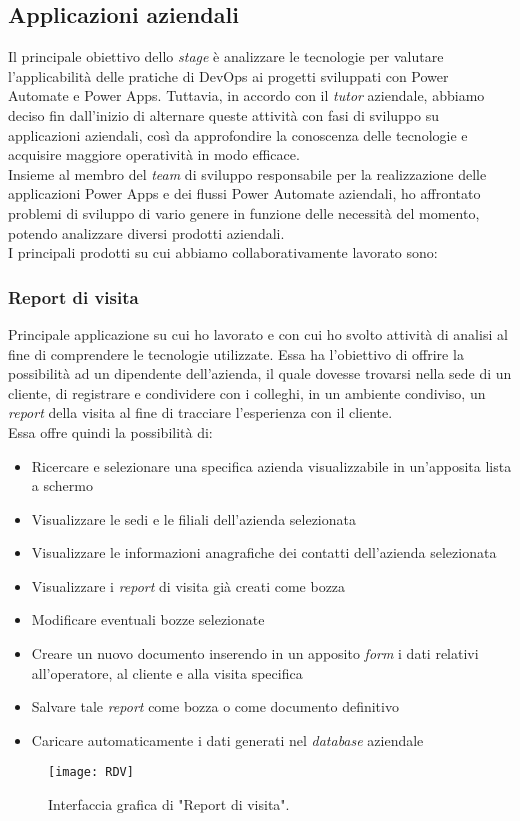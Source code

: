 \newpage \subsection{Applicazioni aziendali}
Il principale obiettivo dello \emph{stage} è analizzare le tecnologie per valutare l'applicabilità delle pratiche di \gls{DevOps} ai progetti sviluppati con Power Automate e Power Apps.
Tuttavia, in accordo con il \emph{tutor} aziendale, abbiamo deciso fin dall'inizio di alternare queste attività con fasi di sviluppo su applicazioni aziendali, così da approfondire la conoscenza delle tecnologie e acquisire maggiore operatività in modo efficace.\\
Insieme al membro del \emph{team} di sviluppo responsabile per la realizzazione delle applicazioni Power Apps e dei flussi Power Automate aziendali, ho affrontato problemi di sviluppo di vario genere in funzione delle necessità del momento, potendo analizzare diversi prodotti aziendali.\\
I principali prodotti su cui abbiamo collaborativamente lavorato sono:

\subsubsection*{Report di visita}
Principale applicazione su cui ho lavorato e con cui ho svolto attività di analisi al fine di comprendere le tecnologie utilizzate.
Essa ha l'obiettivo di offrire la possibilità ad un dipendente dell'azienda, il quale dovesse trovarsi nella sede di un cliente, di registrare e condividere con i colleghi, in un ambiente condiviso, un \emph{report} della visita al fine di tracciare l'esperienza con il cliente.\\
Essa offre quindi la possibilità di: 
\begin{itemize}
    \item Ricercare e selezionare una specifica azienda visualizzabile in un'apposita lista a schermo 
    \item Visualizzare le sedi e le filiali dell'azienda selezionata 
    \item Visualizzare le informazioni anagrafiche dei contatti dell'azienda selezionata  
    \item Visualizzare i \emph{report} di visita già creati come bozza  
    \item Modificare eventuali bozze selezionate 
    \item Creare un nuovo documento inserendo in un apposito \emph{form} i dati relativi all'operatore, al cliente e alla visita specifica 
    \item Salvare tale \emph{report} come bozza o come documento definitivo
    \item Caricare automaticamente i dati generati nel \emph{database} aziendale 
\end{itemize}
\begin{figure}[htbp] 
    \centering 
    \texttt{[image: RDV]} 
    \caption{Interfaccia grafica di "Report di visita".}
    \label{fig:RDV}
\end{figure}

